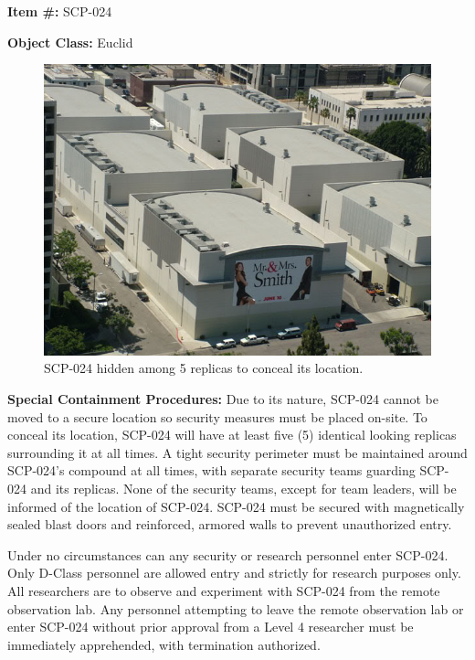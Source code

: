 
\textbf{Item \#:} SCP-024

\textbf{Object Class:} Euclid

\begin{figure}[h]
\begin{center}
\includegraphics[scale=0.4]{scp/024.jpg}
\linebreak SCP-024 hidden among 5 replicas to conceal its location.
\end{center}
\end{figure}

\textbf{Special Containment Procedures:} Due to its nature, SCP-024 cannot be moved to a secure location so security measures must be placed on-site. To conceal its location, SCP-024 will have at least five (5) identical looking replicas surrounding it at all times. A tight security perimeter must be maintained around SCP-024's compound at all times, with separate security teams guarding SCP-024 and its replicas. None of the security teams, except for team leaders, will be informed of the location of SCP-024. SCP-024 must be secured with magnetically sealed blast doors and reinforced, armored walls to prevent unauthorized entry.

Under no circumstances can any security or research personnel enter SCP-024. Only D-Class personnel are allowed entry and strictly for research purposes only. All researchers are to observe and experiment with SCP-024 from the remote observation lab. Any personnel attempting to leave the remote observation lab or enter SCP-024 without prior approval from a Level 4 researcher must be immediately apprehended, with termination authorized.

